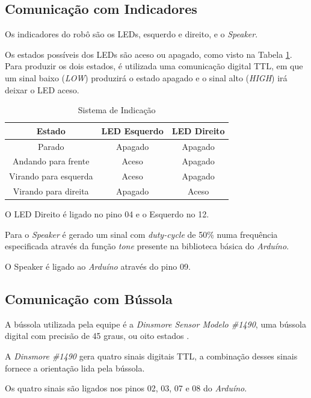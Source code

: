 \subsection{Comunicação com Indicadores}

Os indicadores do robô são os LEDs, esquerdo e direito, e o \textit{Speaker}. 

Os estados possíveis dos LEDs são aceso ou apagado, como visto na Tabela \ref{int_tbl01}. Para produzir os dois estados, é utilizada uma comunicação digital TTL, em que um sinal baixo (\textit{LOW}) produzirá o estado apagado e o sinal alto (\textit{HIGH}) irá deixar o LED aceso.

\begin{table}[h!]
    \centering
    \begin{tabular}{|c|c|c|} \hline
        \textbf{Estado} & \textbf{LED Esquerdo} & \textbf{LED Direito} \\ \hline
        Parado & Apagado & Apagado \\ \hline
        Andando para frente & Aceso & Apagado \\ \hline
        Virando para esquerda & Aceso & Apagado \\ \hline
        Virando para direita & Apagado & Aceso \\ \hline
    \end{tabular}
    \caption{Sistema de Indicação}
    \label{int_tbl01}
\end{table}

O LED Direito é ligado no pino 04 e o Esquerdo no 12.

Para o \textit{Speaker} é gerado um sinal com \textit{duty-cycle} de 50\% numa frequência especificada através da função \textit{tone} presente na biblioteca básica do \textit{Arduíno}.

O Speaker é ligado ao \textit{Arduíno} através do pino 09.

\subsection{Comunicação com Bússola}

A bússola utilizada pela equipe é a \textit{Dinsmore Sensor Modelo \#1490}, uma bússola digital com precisão de 45 graus, ou oito estados \cite{bussola}.

A \textit{Dinsmore \#1490} gera quatro sinais digitais TTL, a combinação desses sinais fornece a orientação lida pela bússola.

Os quatro sinais são ligados nos pinos 02, 03, 07 e 08 do \textit{Arduíno}.

